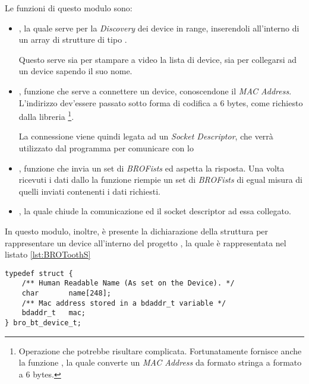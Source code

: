 Le funzioni di questo modulo sono:
\begin{itemize}
    \item {}, la
        quale serve per la \emph{Discovery} dei device 
        in range, inserendoli all'interno di un array di strutture di tipo
        .

        Questo serve sia per stampare a video la lista di device, sia per
        collegarsi ad un device sapendo il suo nome.
    \item {}, funzione
        che serve a connettere un device, conoscendone il \emph{MAC
        Address}. L'indirizzo dev'essere passato sotto forma di codifica a
        $6$ bytes, come richiesto dalla libreria
        \footnote{Operazione che potrebbe risultare
        complicata. Fortunatamente  fornisce anche la
        funzione , la
        quale converte un \emph{MAC Address} da formato stringa a formato a
        $6$ bytes.}.
        
        La connessione viene quindi legata ad un \emph{Socket
        Descriptor}, che verrà utilizzato dal programma per comunicare con
        lo \SPAM{}
    \item {}, funzione che invia un set di \emph{BROFists} ed aspetta la
        risposta. Una volta ricevuti i dati dallo \SPAM{} la funzione
        riempie un set di \emph{BROFists} di egual misura di quelli
        inviati contenenti i dati richiesti.
    \item {}, la quale chiude la
        comunicazione ed il socket descriptor ad essa collegato.
\end{itemize}

In questo modulo, inoltre, è presente la dichiarazione della struttura per
rappresentare un device  all'interno del progetto
\BROFist{}, la quale è rappresentata nel listato \ref{lst:BROToothS}

\begin{figure*}[htbp]
    \begin{lstlisting}[caption=Sample Task-Alarm declaration,
                       label=lst:BROToothS]
typedef struct {
    /** Human Readable Name (As set on the Device). */
    char       name[248];      
    /** Mac address stored in a bdaddr_t variable */
    bdaddr_t   mac;             
} bro_bt_device_t;

    \end{lstlisting}
\end{figure*}

